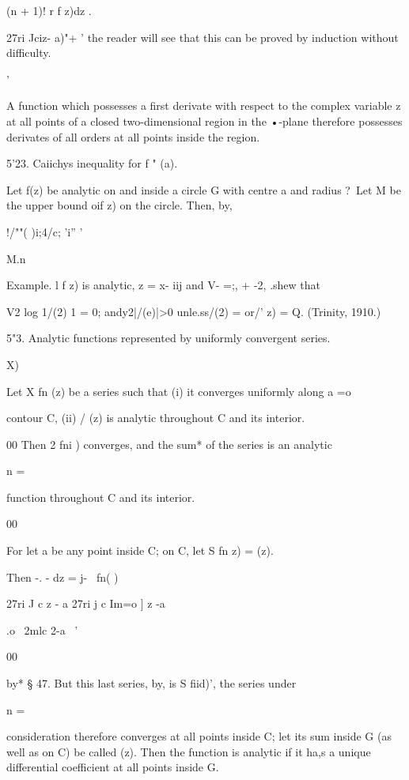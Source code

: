 {{(n + 1)! r f z)dz .

27ri Jciz- a)"+ ' the reader will see that this can be proved by
induction without difficulty.

 '

%
%

A function which possesses a first derivate with respect to the
complex variable z at all points of a closed two-dimensional region in
the •-plane therefore possesses derivates of all orders at all points
inside the region.

5'23. Caiichys inequality for f " (a).

Let f(z) be analytic on and inside a circle G with centre a and radius
?\ Let M be the upper bound oif z) on the circle. Then, by,

!/""( )i;4/c; 'i'' '

M.n\

Example. l f z) is analytic, z = x- iij and V- =;, + -2, .shew that

V2 log 1/(2) 1 = 0; andy2|/(e)|>0 unle.ss/(2) = or/' z) = Q. (Trinity,
1910.)

5"3. Analytic functions represented by uniformly convergent series.

 X)

Let X fn (z) be a series such that (i) it converges uniformly along a
=o

contour C, (ii) / (z) is analytic throughout C and its interior.

00 Then 2 fni ) converges, and the sum* of the series is an analytic

n =

function throughout C and its interior.

00

For let a be any point inside C; on C, let S fn z) = (z).

Then -. - dz = j- \ fn( )\

27ri J c z - a 27ri j c Im=o ] z -a

 .o \ 2mlc 2-a \ '

00

by* § 47. But this last series, by, is S fiid)', the series
under

n =

consideration therefore converges at all points inside C; let its sum
inside G (as well as on C) be called (z). Then the function is
analytic if it ha,s a unique differential coefficient at all points
inside G.

}}
